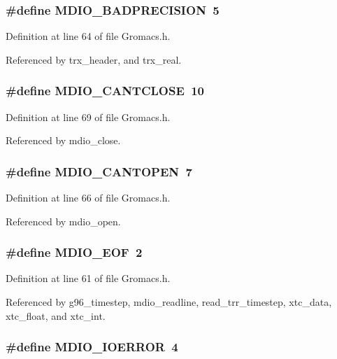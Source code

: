 \subsubsection{\setlength{\rightskip}{0pt plus 5cm}\#define MDIO\_\-BADPRECISION\ 5}\label{Gromacs_8h_a6}




Definition at line 64 of file Gromacs.h.

Referenced by trx\_\-header, and trx\_\-real.
\subsubsection{\setlength{\rightskip}{0pt plus 5cm}\#define MDIO\_\-CANTCLOSE\ 10}\label{Gromacs_8h_a11}




Definition at line 69 of file Gromacs.h.

Referenced by mdio\_\-close.
\subsubsection{\setlength{\rightskip}{0pt plus 5cm}\#define MDIO\_\-CANTOPEN\ 7}\label{Gromacs_8h_a8}




Definition at line 66 of file Gromacs.h.

Referenced by mdio\_\-open.
\subsubsection{\setlength{\rightskip}{0pt plus 5cm}\#define MDIO\_\-EOF\ 2}\label{Gromacs_8h_a3}




Definition at line 61 of file Gromacs.h.

Referenced by g96\_\-timestep, mdio\_\-readline, read\_\-trr\_\-timestep, xtc\_\-data, xtc\_\-float, and xtc\_\-int.
\subsubsection{\setlength{\rightskip}{0pt plus 5cm}\#define MDIO\_\-IOERROR\ 4}\label{Gromacs_8h_a5}




